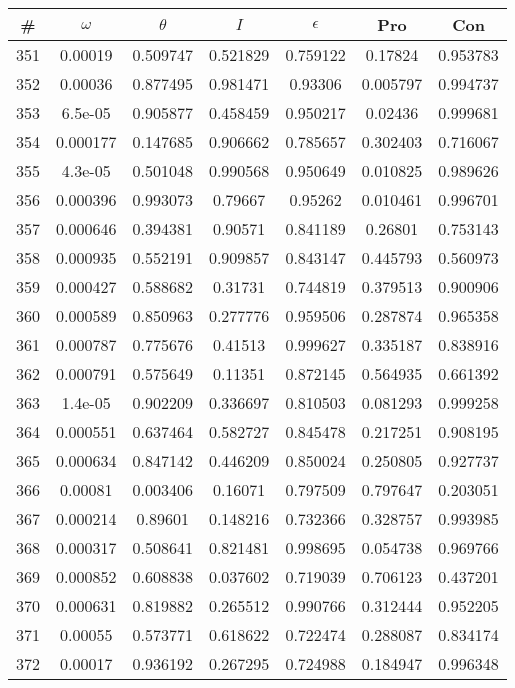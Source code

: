 \newpage
\begin{table}
\begin{tabular}{c|c|c|c|c|c|c}
\# & $\omega$ & $\theta$ & $I$ & $\epsilon$ & Pro & Con\\
\hline
351 & 0.00019 & 0.509747 & 0.521829 & 0.759122 & 0.17824 & 0.953783\\
352 & 0.00036 & 0.877495 & 0.981471 & 0.93306 & 0.005797 & 0.994737\\
353 & 6.5e-05 & 0.905877 & 0.458459 & 0.950217 & 0.02436 & 0.999681\\
354 & 0.000177 & 0.147685 & 0.906662 & 0.785657 & 0.302403 & 0.716067\\
355 & 4.3e-05 & 0.501048 & 0.990568 & 0.950649 & 0.010825 & 0.989626\\
356 & 0.000396 & 0.993073 & 0.79667 & 0.95262 & 0.010461 & 0.996701\\
357 & 0.000646 & 0.394381 & 0.90571 & 0.841189 & 0.26801 & 0.753143\\
358 & 0.000935 & 0.552191 & 0.909857 & 0.843147 & 0.445793 & 0.560973\\
359 & 0.000427 & 0.588682 & 0.31731 & 0.744819 & 0.379513 & 0.900906\\
360 & 0.000589 & 0.850963 & 0.277776 & 0.959506 & 0.287874 & 0.965358\\
361 & 0.000787 & 0.775676 & 0.41513 & 0.999627 & 0.335187 & 0.838916\\
362 & 0.000791 & 0.575649 & 0.11351 & 0.872145 & 0.564935 & 0.661392\\
363 & 1.4e-05 & 0.902209 & 0.336697 & 0.810503 & 0.081293 & 0.999258\\
364 & 0.000551 & 0.637464 & 0.582727 & 0.845478 & 0.217251 & 0.908195\\
365 & 0.000634 & 0.847142 & 0.446209 & 0.850024 & 0.250805 & 0.927737\\
366 & 0.00081 & 0.003406 & 0.16071 & 0.797509 & 0.797647 & 0.203051\\
367 & 0.000214 & 0.89601 & 0.148216 & 0.732366 & 0.328757 & 0.993985\\
368 & 0.000317 & 0.508641 & 0.821481 & 0.998695 & 0.054738 & 0.969766\\
369 & 0.000852 & 0.608838 & 0.037602 & 0.719039 & 0.706123 & 0.437201\\
370 & 0.000631 & 0.819882 & 0.265512 & 0.990766 & 0.312444 & 0.952205\\
371 & 0.00055 & 0.573771 & 0.618622 & 0.722474 & 0.288087 & 0.834174\\
372 & 0.00017 & 0.936192 & 0.267295 & 0.724988 & 0.184947 & 0.996348\\

\end{tabular}
\end{table}
